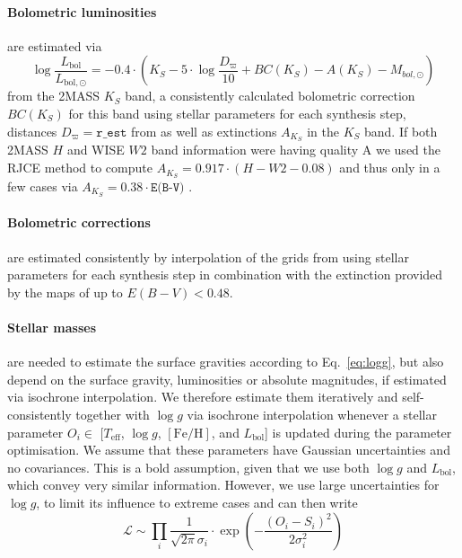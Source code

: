 \documentclass[fleqn,usenatbib,useAMS]{mnras}
\newcommand{\Teff}{$T_\mathrm{eff}$\xspace}
\newcommand{\logg}{$\log g$\xspace}
\newcommand{\feh}{$\mathrm{[Fe/H]}$\xspace}
\newcommand{\lbol}{$L_\mathrm{bol}$\xspace}
\begin{document}
\paragraph*{Bolometric luminosities} are estimated via
\begin{equation}
\log \frac{L_\mathrm{bol}}{L_\mathrm{bol,\odot}} = -0.4 \cdot \left(K_S - 5\cdot \log \frac{D_\varpi}{10} + BC(K_S) - A(K_S) - M_{bol,\odot} \right) \label{eq:lbol}
\end{equation}
from the 2MASS \citep{Skrutskie2006} $K_S$ band, a consistently calculated bolometric correction $BC(K_S)$ for this band using stellar parameters for each synthesis step, distances $D_\varpi = \texttt{r\_est}$ from \citet{BailerJones2018} as well as extinctions $A_{K_S}$ in the $K_S$ band. If both 2MASS $H$ \citep{Skrutskie2006} and WISE $W2$ \citep{Cutri2013} band information were having quality A we used the RJCE method \citep{Majewski2011} to compute $A_{K_S}  = 0.917 \cdot \left( H - W2 - 0.08 \right)$ and thus only in a few cases via $A_{K_S} = 0.38 \cdot \texttt{E(B-V)}$ \citep{Savage1979}.

\paragraph*{Bolometric corrections} are estimated consistently by interpolation of the grids from \citet{Casagrande2014, Casagrande2018} using stellar parameters for each synthesis step in combination with the extinction provided by the maps of \citet{Schlegel1998} up to $E(B-V) < 0.48$.

\paragraph*{Stellar masses} are needed to estimate the surface gravities according to Eq.~\ref{eq:logg}, but also depend on the surface gravity, luminosities or absolute magnitudes, if estimated via isochrone interpolation. We therefore estimate them iteratively and self-consistently together with $\log g$ via isochrone interpolation whenever a stellar parameter $O_i \in$ [\Teff, \logg, \feh, and \lbol] is updated during the parameter optimisation. We assume that these parameters have Gaussian uncertainties and no covariances. This is a bold assumption, given that we use both \logg and \lbol, which convey very similar information. However, we use large uncertainties for \logg, to limit its influence to extreme cases and can then write
\begin{equation}
\mathcal{L} \sim \prod_i \frac{1}{\sqrt{2 \pi} \sigma_i} \cdot \exp \left( - \frac{\left( O_i - S_i \right)^2}{2 \sigma_i^2} \right)
\end{equation}
\end{document}
